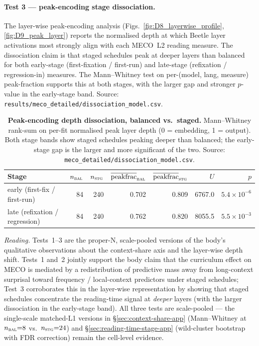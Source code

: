 \paragraph{Test 3 --- peak-encoding stage dissociation.} The layer-wise peak-encoding analysis (Figs.~\ref{fig:D8_layerwise_profile}, \ref{fig:D9_peak_layer}) reports the normalised depth at which Beetle layer activations most strongly align with each MECO~L2 reading measure. The dissociation claim is that staged schedules peak at deeper layers than balanced for both early-stage (first-fixation / first-run) and late-stage (refixation / regression-in) measures. The Mann--Whitney test on per-(model, lang, measure) peak-fraction supports this at both stages, with the larger gap and stronger $p$-value in the early-stage band. Source: \texttt{results/meco\_detailed/dissociation\_model.csv}.

\begin{table}[!ht]
  \centering
  \small
  \caption{\textbf{Peak-encoding depth dissociation, balanced vs.\ staged.} Mann--Whitney rank-sum on per-fit normalised peak layer depth (0 = embedding, 1 = output). Both stage bands show staged schedules peaking deeper than balanced; the early-stage gap is the larger and more significant of the two. Source: \texttt{meco\_detailed/dissociation\_model.csv}.}
  \label{tab:sig_decomp_dissociation}
  \begin{tabular}{lrrrrrr}
    \toprule
    Stage & $n_\textsc{bal}$ & $n_\textsc{stg}$ & $\overline{\text{peakfrac}}_\textsc{bal}$ & $\overline{\text{peakfrac}}_\textsc{stg}$ & $U$ & $p$ \\
    \midrule
    early (first-fix / first-run) & 84 & 240 & 0.702 & 0.809 & 6767.0 & $5.4{\times}10^{-6}$ \\
    late (refixation / regression) & 84 & 240 & 0.762 & 0.820 & 8055.5 & $5.5{\times}10^{-3}$ \\
    \bottomrule
  \end{tabular}
\end{table}

\emph{Reading.} Tests~1--3 are the proper-N, scale-pooled versions of the body's qualitative observations about the context-share axis and the layer-wise depth shift. Tests~1 and~2 jointly support the body claim that the curriculum effect on MECO is mediated by a redistribution of predictive mass away from long-context surprisal toward frequency / local-context predictors under staged schedules; Test~3 corroborates this in the layer-wise representation by showing that staged schedules concentrate the reading-time signal at \emph{deeper} layers (with the larger dissociation in the early-stage band). All three tests are scale-pooled --- the single-scale matched-L1 versions in \S\ref{sec:context-share-app} (Mann--Whitney at $n_\textsc{bal}{=}8$ vs.\ $n_\textsc{stg}{=}24$) and \S\ref{sec:reading-time-stage-app} (wild-cluster bootstrap with FDR correction) remain the cell-level evidence.

